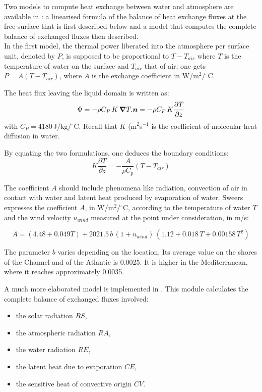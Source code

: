 Two models to compute heat exchange between water and atmosphere are available
in : a linearised formula of the balance of heat exchange fluxes at
the free surface that is first described below and a model that computes the
complete balance of exchanged fluxes then described.\\

In the first model, the thermal power liberated into the atmosphere per
surface unit, denoted by $P$, is supposed to be proportional to $T-T_{air}$
where $T$ is the temperature of water on the surface and $T_{air}$ that of
air; one gets $P=A(T-T_{air})$, where $A$ is the exchange coefficient in
W/m$^{2}$/${^{\circ}}$C.

The heat flux leaving the liquid domain is written as:
\begin{equation}
\Phi=-\rho C_{P\,}K\,\Grad T.\vec{n}=-\rho
C_{P\,}K\dfrac{\partial T}{\partial z}%
\end{equation}
with $C_{P}=4180\,$J/kg/${^{\circ}}$C. Recall that $K$ (m$^2$s$^{-1}$ is the coefficient
of molecular heat diffusion in water.

By equating the two formulations, one deduces the boundary conditions:%
\begin{equation}
K\dfrac{\partial T}{\partial z}=-\dfrac{A}{\rho C_{p}}\left(
T-T_{air}\right)
\end{equation}

The coefficient $A$ should include phenomena like radiation, convection of air
in contact with water and latent heat produced by evaporation of water. Sweers
\cite{sweers76} expresses the coefficient $A$, in W/m$^{2}$/${^{\circ}}$C,
according to the temperature of water $T$ and the wind velocity $u_{wind}$ measured
at the point under consideration, in m/s:%

\begin{equation}
\label{sweers}A=(4.48+0.049T)+2021.5\,b\,(1+u_{wind})\,(1.12+0.018\,T+0.00158\,T^{2})
\end{equation}

The parameter $b$ varies depending on the location. Its average value on the
shores of the Channel and of the Atlantic is 0.0025. It is higher in the
Mediterranean, where it reaches approximately 0.0035. \newline

A much more elaborated model is implemented in . This module
calculates the complete balance of exchanged fluxes involved:

\begin{itemize}
\item the solar radiation $RS$,
\item the atmospheric radiation $RA$,
\item the water radiation $RE$,
\item the latent heat due to evaporation $CE$,
\item the sensitive heat of convective origin $CV$.
\end{itemize}

